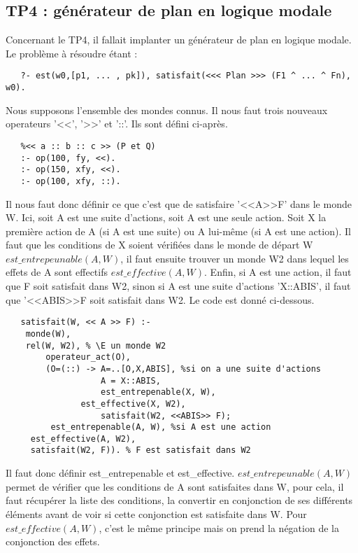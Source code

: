 \documentclass[a4paper,10pt]{article}
\begin{document}
  \subsection{TP4 : g\'{e}n\'{e}rateur de plan en logique modale}
  Concernant le TP4, il fallait implanter un g\'{e}n\'{e}rateur de plan en logique modale.
  Le probl\`{e}me \`{a} r\'{e}soudre \'{e}tant :
  
   \begin{lstlisting}
   ?- est(w0,[p1, ... , pk]), satisfait(<<< Plan >>> (F1 ^ ... ^ Fn), w0).
   \end{lstlisting}
   
  Nous supposons l'ensemble des mondes connus. Il nous faut trois nouveaux operateurs '<<', '>>' et '::'. Ils sont d\'{e}fini ci-apr\`{e}s.
  
   \begin{lstlisting}
   %<< a :: b :: c >> (P et Q)
   :- op(100, fy, <<).
   :- op(150, xfy, <<).
   :- op(100, xfy, ::).
   \end{lstlisting}
   
  Il nous faut donc d\'{e}finir ce que c'est que de satisfaire '<<A>>F' dans le monde W. Ici, soit A est une suite d'actions, soit A est une seule action. Soit X la première action de A
  (si A est une suite) ou A lui-m\^{e}me (si A est une action). Il faut que les conditions de X soient v\'{e}rifi\'{e}es dans le monde de d\'{e}part W $est\_entrepeunable(A, W)$,
  il faut ensuite trouver un monde W2 dans lequel les effets de A sont effectifs $est\_effective(A, W)$. Enfin, si A est une action, il faut que F soit satisfait
  dans W2, sinon si A est une suite d'actions 'X::ABIS', il faut que '<<ABIS>>F soit satisfait dans W2. Le code est donn\'{e} ci-dessous.
  
  \begin{lstlisting}
   satisfait(W, << A >> F) :-
	monde(W),
	rel(W, W2), % \E un monde W2
        operateur_act(O),
        (O=(::) -> A=..[O,X,ABIS], %si on a une suite d'actions
                   A = X::ABIS, 
                   est_entrepenable(X, W),
	           est_effective(X, W2),
                   satisfait(W2, <<ABIS>> F);
         est_entrepenable(A, W), %si A est une action
	 est_effective(A, W2),
	 satisfait(W2, F)). % F est satisfait dans W2
   \end{lstlisting}
   
   Il faut donc d\'{e}finir est\_entrepenable et est\_effective. $est\_entrepeunable(A, W)$ permet de v\'{e}rifier que les conditions de A sont satisfaites dans W,
   pour cela, il faut r\'{e}cup\'{e}rer la liste des conditions, la convertir en conjonction de ses diff\'{e}rents \'{e}l\'{e}ments avant de voir si cette conjonction
   est satisfaite dans W. Pour $est\_effective(A, W)$, c'est le m\^{e}me principe mais on prend la n\'{e}gation de la conjonction des effets.
   
\end{document}
